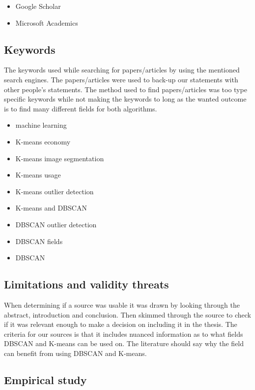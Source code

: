 \documentclass[a4paper]{article}
\begin{document}
\begin{itemize}  
\item Google Scholar
\item Microsoft Academics
\end{itemize}

\subsection{Keywords}

The keywords used while searching for papers/articles by using the mentioned search engines. The papers/articles were used to back-up our statements with other people's statements. The method used to find papers/articles was too type specific keywords while not making the keywords to long as the wanted outcome is to find many different fields for both algorithms.

\begin{itemize}  
\item machine learning

\item K-means economy
\item K-means image segmentation
\item K-means usage
\item K-means outlier detection
\item K-means and DBSCAN
\item DBSCAN outlier detection
\item DBSCAN fields
\item DBSCAN
\end{itemize}

\subsection{Limitations and validity threats}

When determining if a source was usable it was drawn by looking through the abstract, introduction and conclusion. Then skimmed through the source to check if it was relevant enough to make a decision on including it in the thesis. The criteria for our sources is that it includes nuanced information as to what fields DBSCAN and K-means can be used on. The literature should say why the field can benefit from using DBSCAN and K-means.

\newpage
\subsection{Empirical study}
\end{document}

